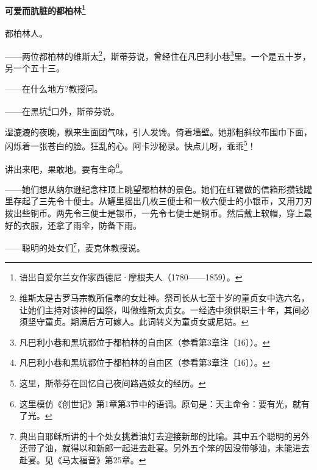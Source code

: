 \paragraph*{可爱而肮脏的都柏林\footnote{语出自爱尔兰女作家西德尼·摩根夫人（1780——1859）。}}
\par 都柏林人。
\par ——两位都柏林的维斯太\footnote{维斯太是古罗马宗教所信奉的女灶神。祭司长从七至十岁的童贞女中选六名，让她们主持对该神的国祭，叫做维斯太贞女。一经选中须供职三十年，其间必须坚守童贞。期满后方可嫁人。此词转义为童贞女或尼姑。}，斯蒂芬说，曾经住在凡巴利小巷\footnote{凡巴利小巷和黑坑都位于都柏林的自由区（参看第3章注〔16〕）。}里。一个是五十岁，另一个五十三。
\par ——在什么地方?教授问。
\par ——在黑坑\footnote{凡巴利小巷和黑坑都位于都柏林的自由区（参看第3章注〔16〕）。}口外，斯蒂芬说。
\par 湿漉漉的夜晚，飘来生面团气味，引人发馋。倚着墙壁。她那粗斜纹布围巾下面，闪烁着一张苍白的脸。狂乱的心。阿卡沙秘录。快点儿呀，乖乖\footnote{这里，斯蒂芬在回忆自己夜间路遇妓女的经历。}！
\par 讲出来吧，果敢地。要有生命\footnote{这里模仿《创世记》第1章第3节中的语调。原句是：天主命令：要有光，就有了光。}。
\par ——她们想从纳尔逊纪念柱顶上眺望都柏林的景色。她们在红锡做的信箱形攒钱罐里存起了三先令十便士。从罐里摇出几枚三便士和一枚六便士的小银币，又用刀刃拨出些铜币。两先令三便士是银币，一先令七便士是铜币。然后戴上软帽，穿上最好的衣服，还拿了雨伞，防备下雨。
\par ——聪明的处女们\footnote{典出自耶稣所讲的十个处女挑着油灯去迎接新郎的比喻。其中五个聪明的另外还带了油，就得以和新郎一起进去赴宴。另外五个笨的因没带够油，未能进去赴宴。见《马太福音》第25章。}，麦克休教授说。
